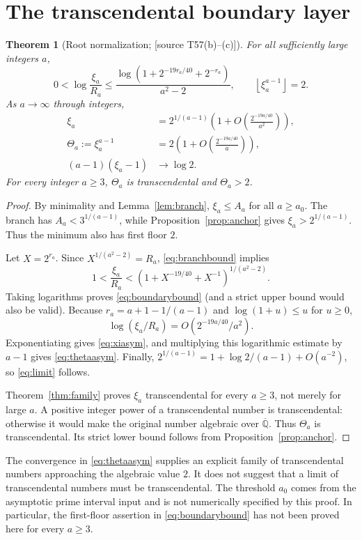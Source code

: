 \documentclass[11pt,a4paper]{article}
\newtheorem{theorem}{Theorem}[section]
\theoremstyle{definition}\newtheorem{definition}[theorem]{Definition}
\theoremstyle{remark}\newtheorem{remark}[theorem]{Remark}
\newcommand{\Qbar}{\overline{\mathbb Q}}
\newcommand{\floor}[1]{\left\lfloor #1\right\rfloor}\newcommand{\ceil}[1]{\left\lceil #1\right\rceil}
\newcommand{\sourceT}[1]{\textup{[source T#1]}}
\begin{document}
\section{The transcendental boundary layer}
\begin{theorem}[Root normalization; \sourceT{57(b)--(c)}]
\label{thm:boundary}
For all sufficiently large integers $a$,
\begin{equation}\label{eq:boundarybound}
 0<\log\frac{\xi_a}{R_a}
 \le\frac{\log(1+2^{-19r_a/40}+2^{-r_a})}{a^2-2},
 \qquad \floor{\xi_a^{a-1}}=2.
\end{equation}
As $a\to\infty$ through integers,
\begin{align}
 \xi_a&=2^{1/(a-1)}
 \left(1+O\left(\frac{2^{-19a/40}}{a^2}\right)\right),
 \label{eq:xiasym}\\
 \Theta_a:=\xi_a^{a-1}
 &=2\left(1+O\left(\frac{2^{-19a/40}}a\right)\right),
 \label{eq:thetaasym}\\
 (a-1)(\xi_a-1)&\longrightarrow\log2.
 \label{eq:limit}
\end{align}
For every integer $a\ge3$, $\Theta_a$ is transcendental and
$\Theta_a>2$.
\end{theorem}
\begin{proof}
By minimality and Lemma~\ref{lem:branch}, $\xi_a\le A_a$ for all
$a\ge a_0$. The branch has $A_a<3^{1/(a-1)}$, while
Proposition~\ref{prop:anchor} gives $\xi_a>2^{1/(a-1)}$.
Thus the minimum also has first floor $2$.

Let $X=2^{r_a}$. Since $X^{1/(a^2-2)}=R_a$,
\eqref{eq:branchbound} implies
\[
 1<\frac{\xi_a}{R_a}
 <(1+X^{-19/40}+X^{-1})^{1/(a^2-2)}.
\]
Taking logarithms proves \eqref{eq:boundarybound} (and a strict upper
bound would also be valid). Because
$r_a=a+1-1/(a-1)$ and $\log(1+u)\le u$ for $u\ge0$,
\[
 \log(\xi_a/R_a)=O(2^{-19a/40}/a^2).
\]
Exponentiating gives \eqref{eq:xiasym}, and multiplying this
logarithmic estimate by $a-1$ gives \eqref{eq:thetaasym}.
Finally,
$2^{1/(a-1)}=1+\log2/(a-1)+O(a^{-2})$, so
\eqref{eq:limit} follows.

Theorem~\ref{thm:family} proves $\xi_a$ transcendental for every
$a\ge3$, not merely for large $a$. A positive integer power of a
transcendental number is transcendental: otherwise it would make the
original number algebraic over $\Qbar$. Thus $\Theta_a$ is
transcendental. Its strict lower bound follows from
Proposition~\ref{prop:anchor}.
\end{proof}

The convergence in \eqref{eq:thetaasym} supplies an explicit family
of transcendental numbers approaching the algebraic value $2$.
It does not suggest that a limit of transcendental numbers must be
transcendental. The threshold $a_0$ comes from the asymptotic prime
interval input and is not numerically specified by this proof.
In particular, the first-floor assertion in
\eqref{eq:boundarybound} has not been proved here for every $a\ge3$.
\end{document}
